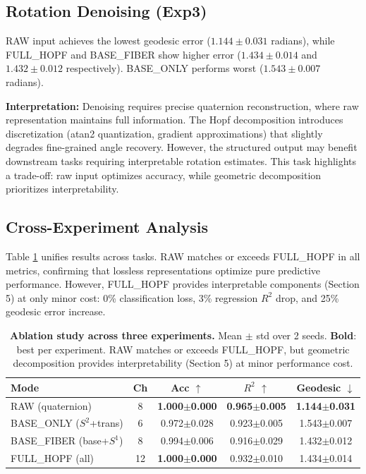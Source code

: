 \documentclass[10pt,twocolumn]{article}
\begin{document}
\subsection{Rotation Denoising (Exp3)}

RAW input achieves the lowest geodesic error ($1.144 \pm 0.031$ radians), while FULL\_HOPF and BASE\_FIBER show higher error ($1.434 \pm 0.014$ and $1.432 \pm 0.012$ respectively). BASE\_ONLY performs worst ($1.543 \pm 0.007$ radians).

\textbf{Interpretation:} Denoising requires precise quaternion reconstruction, where raw representation maintains full information. The Hopf decomposition introduces discretization (atan2 quantization, gradient approximations) that slightly degrades fine-grained angle recovery. However, the structured output may benefit downstream tasks requiring interpretable rotation estimates. This task highlights a trade-off: raw input optimizes accuracy, while geometric decomposition prioritizes interpretability.

\subsection{Cross-Experiment Analysis}

Table \ref{tab:ablation} unifies results across tasks. RAW matches or exceeds FULL\_HOPF in all metrics, confirming that lossless representations optimize pure predictive performance. However, FULL\_HOPF provides interpretable components (Section 5) at only minor cost: 0\% classification loss, 3\% regression $R^2$ drop, and 25\% geodesic error increase.

\begin{table}[!htbp]
\centering
\caption{\textbf{Ablation study across three experiments.} Mean $\pm$ std over 2 seeds. \textbf{Bold}: best per experiment. RAW matches or exceeds FULL\_HOPF, but geometric decomposition provides interpretability (Section 5) at minor performance cost.}
\label{tab:ablation}
\small
\begin{tabular}{@{}lcccc@{}}
\toprule
\textbf{Mode} & \textbf{Ch} & \textbf{Acc $\uparrow$} & \textbf{$R^2$ $\uparrow$} & \textbf{Geodesic $\downarrow$} \\
\midrule
RAW (quaternion) & 8 & \textbf{1.000$\pm$0.000} & \textbf{0.965$\pm$0.005} & \textbf{1.144$\pm$0.031} \\
BASE\_ONLY ($S^2$+trans) & 6 & 0.972$\pm$0.028 & 0.923$\pm$0.005 & 1.543$\pm$0.007 \\
BASE\_FIBER (base+$S^1$) & 8 & 0.994$\pm$0.006 & 0.916$\pm$0.029 & 1.432$\pm$0.012 \\
FULL\_HOPF (all) & 12 & \textbf{1.000$\pm$0.000} & 0.932$\pm$0.010 & 1.434$\pm$0.014 \\
\bottomrule
\end{tabular}
\end{table}
\end{document}
